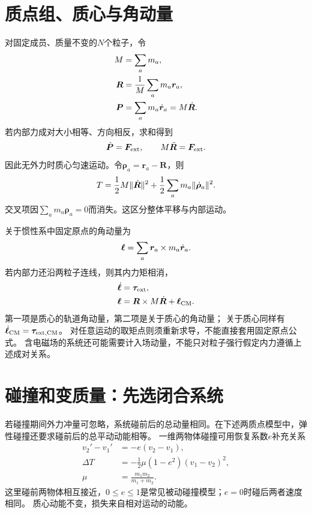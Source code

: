 \section{质点组、质心与角动量}
对固定成员、质量不变的$N$个粒子，令
\begin{subequations}
 \begin{align}
  M &= \sum_a m_a,\\
  \bm R &= \frac1M\sum_a m_a\bm r_a,\\
  \bm P &= \sum_a m_a\dot{\bm{r}}_a = M\dot{\bm{R}}.
 \end{align}
\end{subequations}
若内部力成对大小相等、方向相反，求和得到
\begin{equation}
 \dot{\bm{P}} = \bm F_{\mathrm{ext}},\qquad M\ddot{\bm R} = \bm F_{\mathrm{ext}}.
\end{equation}
因此无外力时质心匀速运动。令$\bm\rho_a = \bm r_a - \bm R$，则
\begin{equation}
 T = \frac12M\lVert\dot{\bm{R}}\rVert^2 + \frac12\sum_a m_a\lVert\dot{\bm{\rho}}_a\rVert^2.
 \label{eq:cm-com-energy}
\end{equation}
交叉项因$\textstyle \sum_a m_a\bm\rho_a = 0$而消失。这区分整体平移与内部运动。

关于惯性系中固定原点的角动量为
\begin{equation}\label{eq:cm-total-angular-momentum}
 \bm\ell = \sum_a\bm r_a \times m_a\dot{\bm{r}}_a.
\end{equation}
若内部力还沿两粒子连线，则其内力矩相消，
\begin{subequations}
 \begin{align}
  \dot{\bm{\ell}} &= \bm\tau_{\mathrm{ext}},\\
  \bm\ell &= \bm R \times M\dot{\bm{R}} + \bm\ell_{\mathrm{CM}}.
 \end{align}
\end{subequations}
第一项是质心的轨道角动量，第二项是关于质心的角动量；
关于质心同样有$\dot{\bm{\ell}}_{\mathrm{CM}} = \bm\tau_{\mathrm{ext},\mathrm{CM}}$。
对任意运动的取矩点则须重新求导，不能直接套用固定原点公式。
含电磁场的系统还可能需要计入场动量，不能只对粒子强行假定内力遵循上述成对关系。

\section{碰撞和变质量：先选闭合系统}
若碰撞期间外力冲量可忽略，系统碰前后的总动量相同。在下述两质点模型中，弹性碰撞还要求碰前后的总平动动能相等。
一维两物体碰撞可用恢复系数$e$补充关系
\begin{subequations}
 \begin{align}
  v_2' - v_1' &= -e(v_2 - v_1),\\
  \Delta T &= -\frac12\mu(1 - e^2)(v_1 - v_2)^2,\\
  \mu &= \frac{m_1m_2}{m_1 + m_2}.
 \end{align}
\end{subequations}
这里碰前两物体相互接近，$0 \leq e \leq 1$是常见被动碰撞模型；$e = 0$时碰后两者速度相同。
质心动能不变，损失来自相对运动的动能。


